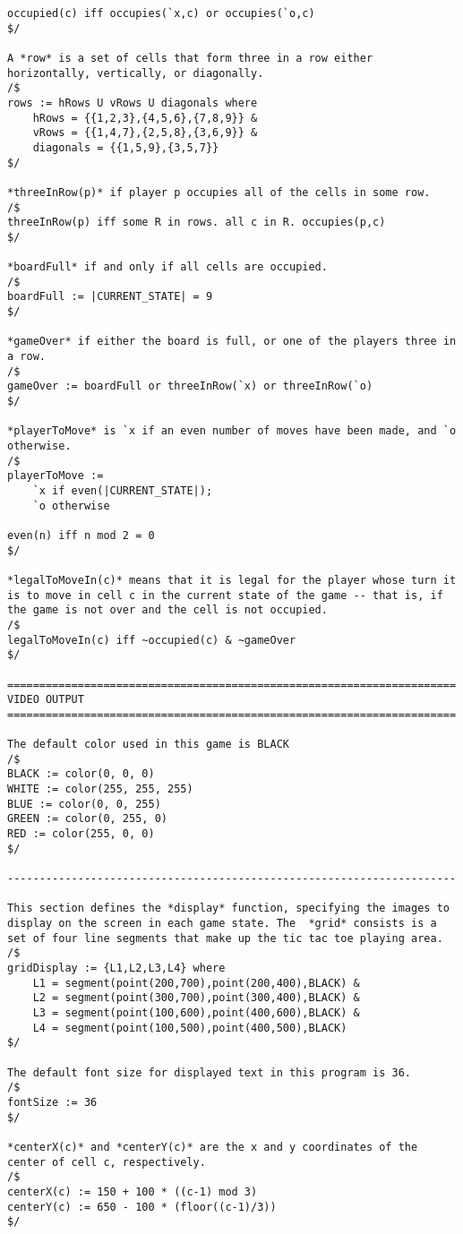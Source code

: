 \documentclass[letterpaper, 14pt]{extarticle}
\begin{document}
\begin{flushleft}
\begin{lstlisting}
occupied(c) iff occupies(`x,c) or occupies(`o,c)
$/

A *row* is a set of cells that form three in a row either horizontally, vertically, or diagonally.
/$
rows := hRows U vRows U diagonals where
    hRows = {{1,2,3},{4,5,6},{7,8,9}} &
    vRows = {{1,4,7},{2,5,8},{3,6,9}} &
    diagonals = {{1,5,9},{3,5,7}}
$/

*threeInRow(p)* if player p occupies all of the cells in some row.
/$
threeInRow(p) iff some R in rows. all c in R. occupies(p,c)
$/

*boardFull* if and only if all cells are occupied.
/$
boardFull := |CURRENT_STATE| = 9
$/

*gameOver* if either the board is full, or one of the players three in a row.
/$
gameOver := boardFull or threeInRow(`x) or threeInRow(`o)
$/

*playerToMove* is `x if an even number of moves have been made, and `o otherwise.
/$
playerToMove :=
    `x if even(|CURRENT_STATE|);
    `o otherwise

even(n) iff n mod 2 = 0
$/

*legalToMoveIn(c)* means that it is legal for the player whose turn it is to move in cell c in the current state of the game -- that is, if the game is not over and the cell is not occupied.
/$
legalToMoveIn(c) iff ~occupied(c) & ~gameOver
$/

======================================================================
VIDEO OUTPUT
======================================================================

The default color used in this game is BLACK
/$
BLACK := color(0, 0, 0)
WHITE := color(255, 255, 255)
BLUE := color(0, 0, 255)
GREEN := color(0, 255, 0)
RED := color(255, 0, 0)
$/

----------------------------------------------------------------------

This section defines the *display* function, specifying the images to display on the screen in each game state. The  *grid* consists is a set of four line segments that make up the tic tac toe playing area.
/$
gridDisplay := {L1,L2,L3,L4} where
    L1 = segment(point(200,700),point(200,400),BLACK) &
    L2 = segment(point(300,700),point(300,400),BLACK) &
    L3 = segment(point(100,600),point(400,600),BLACK) &
    L4 = segment(point(100,500),point(400,500),BLACK)
$/

The default font size for displayed text in this program is 36.
/$
fontSize := 36
$/

*centerX(c)* and *centerY(c)* are the x and y coordinates of the center of cell c, respectively.
/$
centerX(c) := 150 + 100 * ((c-1) mod 3)
centerY(c) := 650 - 100 * (floor((c-1)/3))
$/


\end{lstlisting}
\end{flushleft}
\end{document}

